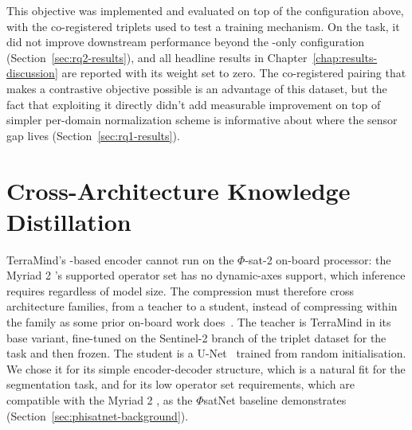This objective was implemented and evaluated on top of the  configuration above, with the co-registered triplets used to test a training mechanism.
On the  task, it did not improve downstream performance beyond the -only configuration (Section~\ref{sec:rq2-results}), and all headline results in Chapter~\ref{chap:results-discussion} are reported with its weight set to zero.
The co-registered pairing that makes a contrastive objective possible is an advantage of this dataset, but the fact that exploiting it directly didn't add measurable improvement on top of simpler per-domain normalization scheme is informative about where the sensor gap lives (Section~\ref{sec:rq1-results}).

\section{Cross-Architecture Knowledge Distillation}
\label{sec:kd}

TerraMind's -based encoder cannot run on the $\Phi$-sat-2 on-board processor: the Myriad 2 's supported operator set has no dynamic-axes support, which  inference requires regardless of model size.
The compression must therefore cross architecture families, from a  teacher to a  student, instead of compressing within the  family as some prior on-board  work does~\cite{du2025onorbitdemonstrationgeospatialfoundation}.
The teacher is TerraMind in its base variant, fine-tuned on the Sentinel-2 branch of the triplet dataset for the  task and then frozen.
The student is a U-Net~\cite{ronneberger2015unet} trained from random initialisation.
We chose it for its simple encoder-decoder structure, which is a natural fit for the segmentation task, and for its low operator set requirements, which are compatible with the Myriad 2 , as the $\Phi$satNet baseline demonstrates (Section~\ref{sec:phisatnet-background}).

